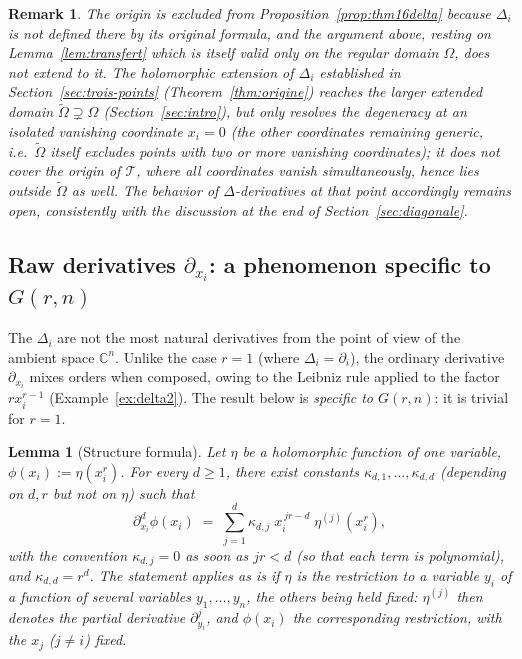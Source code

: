 \documentclass[10pt,a4paper]{amsart}
\newtheorem{lemma}[theorem]{Lemma}
\newtheorem{remark}[theorem]{Remark}
\newcommand{\CC}{\mathbb{C}}
\begin{document}
\begin{remark}
The origin is excluded from Proposition~\ref{prop:thm16delta} because $\Delta_i$ is not defined there by its original formula, and the argument above, resting on Lemma~\ref{lem:transfert} which is itself valid only on the regular domain $\Omega$, does not extend to it. The holomorphic extension of $\Delta_i$ established in Section~\ref{sec:trois-points} (Theorem~\ref{thm:origine}) reaches the larger extended domain $\widetilde\Omega\supsetneq\Omega$ (Section~\ref{sec:intro}), but only resolves the degeneracy at an \emph{isolated} vanishing coordinate $x_i=0$ (the other coordinates remaining generic, i.e.\ $\widetilde\Omega$ itself excludes points with two or more vanishing coordinates); it does not cover the origin of $\mathcal T$, where \emph{all} coordinates vanish simultaneously, hence lies outside $\widetilde\Omega$ as well. The behavior of $\Delta$-derivatives at that point accordingly remains open, consistently with the discussion at the end of Section~\ref{sec:diagonale}.
\end{remark}

\subsection{Raw derivatives $\partial_{x_i}$: a phenomenon specific to $G(r,n)$}

The $\Delta_i$ are not the most natural derivatives from the point of view of the ambient space $\CC^n$. Unlike the case $r=1$ (where $\Delta_i=\partial_i$), the ordinary derivative $\partial_{x_i}$ mixes orders when composed, owing to the Leibniz rule applied to the factor $rx_i^{r-1}$ (Example~\ref{ex:delta2}). The result below is \emph{specific to $G(r,n)$}: it is trivial for $r=1$.

\begin{lemma}[Structure formula]\label{lem:faadibruno}
Let $\eta$ be a holomorphic function of one variable, $\phi(x_i):=\eta(x_i^r)$. For every $d\ge1$, there exist constants $\kappa_{d,1},\dots,\kappa_{d,d}$ (depending on $d,r$ but not on $\eta$) such that
\[
\partial_{x_i}^d\phi(x_i) \;=\; \sum_{j=1}^{d} \kappa_{d,j}\;x_i^{\,jr-d}\;\eta^{(j)}(x_i^r),
\]
with the convention $\kappa_{d,j}=0$ as soon as $jr<d$ (so that each term is polynomial), and $\kappa_{d,d}=r^d$. The statement applies as is if $\eta$ is the restriction to a variable $y_i$ of a function of several variables $y_1,\dots,y_n$, the others being held fixed: $\eta^{(j)}$ then denotes the partial derivative $\partial_{y_i}^j$, and $\phi(x_i)$ the corresponding restriction, with the $x_j$ ($j\ne i$) fixed.
\end{lemma}
\end{document}
